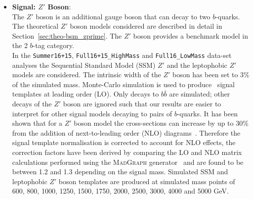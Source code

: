 \begin{itemize}[leftmargin=*]
\item\textbf{Signal: $Z'$ Boson}:  \vspace{1em} \\
  The $Z'$ boson is an additional gauge boson that can decay to two $b$-quarks.
  The theoretical $Z'$ boson models considered are
  described in detail in Section~\ref{sec:theo-bsm_zprime}.
  The $Z'$ boson provides a benchmark model in the 2 $b$-tag category.\\

  In the \verb|Summer16+15|, \verb|Full16+15_HighMass| and \verb|Full16_LowMass| data-set analyses
  the Sequential Standard Model (SSM) $Z'$ and the leptophobic $Z'$ models are considered.
  The intrinsic width of the $Z'$ boson has been set to 3\% of the simulated mass.
  Monte-Carlo simulation is used to produce \mjj~signal templates at leading order (LO).
  Only decays to $b\bar{b}$ are simulated;
  other decays of the  $Z'$ boson are ignored such that our
  results are easier to interpret for other signal models decaying to pairs of $b$-quarks.
  It has been shown that for a $Z'$ boson model the cross-sections can increase by up to 30\%
  from the addition of next-to-leading order (NLO) diagrams~\cite{evt-NLO_zprime}.
  Therefore the signal template normalisation is corrected to account for NLO effects,
  the correction factors have been derived by comparing
  the LO and NLO matrix calculations performed using the \textsc{MadGraph} generator~\cite{dibjet-madGraph}
  and are found to be between 1.2 and 1.3 depending on the signal mass.
  Simulated SSM and leptophobic $Z'$ boson templates are produced at simulated mass points of
  600, 800, 1000, 1250, 1500, 1750, 2000, 2500, 3000, 4000 and 5000 GeV.\\
  

\end{itemize}
